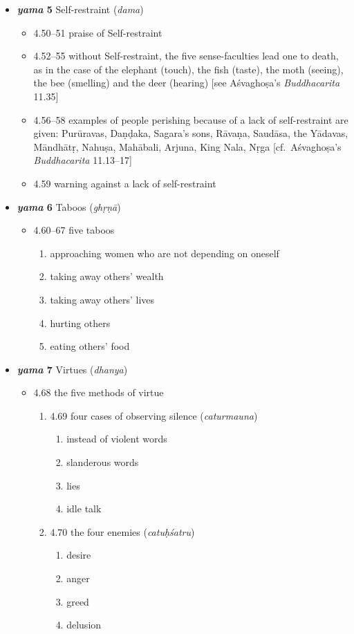 \documentclass[11pt]{book} %
\newcommand{\skt}[1]{\textit{#1}}
\begin{document}
\begin{itemize}
\pagebreak

\item \textbf{\skt{yama} 5}  Self-restraint (\skt{dama})
\begin{itemize}
\item 4.50--51 praise of Self-restraint
\item 4.52--55 without Self-restraint, 
the five sense-faculties lead one to death, 
as in the case of the elephant (touch), 
the fish (taste), the moth (seeing), the bee (smelling) 
and the deer (hearing) [see Aśvaghoṣa's \textit{Buddhacarita} 11.35]
\item 4.56--58 examples of people perishing because of a lack of
    self-restraint are given: Purūravas, Daṇḍaka, Sagara’s sons, 
    Rāvaṇa, Saudāsa, the Yādavas, Māndhātṛ, Nahuṣa,
    Mahābali, Arjuna, King Nala, Nṛga [cf.\ Aśvaghoṣa's   
    \textit{Buddhacarita} 11.13--17]
\item 4.59 warning against a lack of self-restraint 
\end{itemize}

\item \textbf{\skt{yama} 6}  Taboos (\skt{ghṛṇā})
\begin{itemize}
\item 4.60--67 five taboos
  \begin{enumerate}
  \item approaching women who are not depending on oneself
  \item taking away others' wealth
  \item taking away others' lives
  \item hurting others 
  \item eating others' food
  \end{enumerate}
\end{itemize}

\item \textbf{\skt{yama} 7} Virtues (\skt{dhanya}) 
\begin{itemize}
\item 4.68 the five methods of virtue
  \begin{enumerate}
  \item 4.69 four cases of observing silence (\skt{caturmauna})
      \begin{enumerate}
      \item instead of violent words
      \item slanderous words 
      \item lies
      \item idle talk
      \end{enumerate}
  \item 4.70 the four enemies (\skt{catuḥśatru})
        \begin{enumerate}
      \item desire
      \item anger 
      \item greed
      \item delusion
      \end{enumerate}
      

\end{enumerate}
\end{itemize}
\end{itemize}
\end{document}
